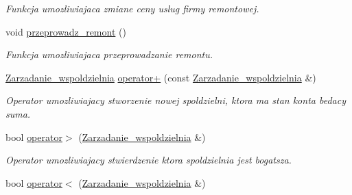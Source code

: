 \begin{DoxyCompactItemize}
\begin{DoxyCompactList}\small\item\em Funkcja umozliwiajaca zmiane ceny uslug firmy remontowej. \end{DoxyCompactList}\item 
\hypertarget{class_zarzadanie__wspoldzielnia_a0280cc672c127673217e8a31de57b210}{}void \hyperlink{class_zarzadanie__wspoldzielnia_a0280cc672c127673217e8a31de57b210}{przeprowadz\+\_\+remont} ()\label{class_zarzadanie__wspoldzielnia_a0280cc672c127673217e8a31de57b210}

\begin{DoxyCompactList}\small\item\em Funkcja umozliwiajaca przeprowadzanie remontu. \end{DoxyCompactList}\item 
\hypertarget{class_zarzadanie__wspoldzielnia_a00418cfb3dde37869cc68b3daf580dff}{}\hyperlink{class_zarzadanie__wspoldzielnia}{Zarzadanie\+\_\+wspoldzielnia} \hyperlink{class_zarzadanie__wspoldzielnia_a00418cfb3dde37869cc68b3daf580dff}{operator+} (const \hyperlink{class_zarzadanie__wspoldzielnia}{Zarzadanie\+\_\+wspoldzielnia} \&)\label{class_zarzadanie__wspoldzielnia_a00418cfb3dde37869cc68b3daf580dff}

\begin{DoxyCompactList}\small\item\em Operator umozliwiajacy stworzenie nowej spoldzielni, ktora ma stan konta bedacy suma. \end{DoxyCompactList}\item 
\hypertarget{class_zarzadanie__wspoldzielnia_ad457fe5a321df131677eae6a55f439d9}{}bool \hyperlink{class_zarzadanie__wspoldzielnia_ad457fe5a321df131677eae6a55f439d9}{operator$>$} (\hyperlink{class_zarzadanie__wspoldzielnia}{Zarzadanie\+\_\+wspoldzielnia} \&)\label{class_zarzadanie__wspoldzielnia_ad457fe5a321df131677eae6a55f439d9}

\begin{DoxyCompactList}\small\item\em Operator umozliwiajacy stwierdzenie ktora spoldzielnia jest bogatsza. \end{DoxyCompactList}\item 
\hypertarget{class_zarzadanie__wspoldzielnia_a886385060b4570577f46ea42e6c6287f}{}bool \hyperlink{class_zarzadanie__wspoldzielnia_a886385060b4570577f46ea42e6c6287f}{operator$<$} (\hyperlink{class_zarzadanie__wspoldzielnia}{Zarzadanie\+\_\+wspoldzielnia} \&)\label{class_zarzadanie__wspoldzielnia_a886385060b4570577f46ea42e6c6287f}


\end{DoxyCompactItemize}
